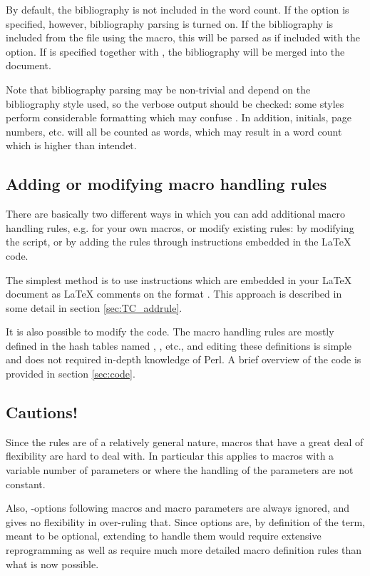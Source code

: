 \documentclass{article}
\begin{document}
By default, the bibliography is not included in the word count. If the  option is specified, however, bibliography parsing is turned on. If the bibliography is included from the  file using the  macro, this will be parsed as if included with the  option. If  is specified together with , the bibliography will be merged into the document.

Note that bibliography parsing may be non-trivial and depend on the bibliography style used, so the verbose output should be checked: some styles perform considerable formatting which may confuse \TeXcount{}. In addition, initials, page numbers, etc. will all be counted as words, which may result in a word count which is higher than intendet.

\subsection{Adding or modifying macro handling rules}

There are basically two different ways in which you can add additional macro handling rules, e.g. for your own macros, or modify existing rules: by modifying the \TeXcount{} script, or by adding the rules through \TeXcount{} instructions embedded in the \LaTeX{} code.

The simplest method is to use \TeXcount{} instructions which are embedded in your \LaTeX{} document as \LaTeX{} comments on the format . This approach is described in some detail in section \ref{sec:TC_addrule}.

It is also possible to modify the \TeXcount{} code. The macro handling rules are mostly defined in the hash tables named , , etc., and editing these definitions is simple and does not required in-depth knowledge of Perl. A brief overview of the \TeXcount{} code is provided in section \ref{sec:code}. 

\subsection{Cautions!}

Since the rules are of a relatively general nature, macros that have a great deal of flexibility are hard to deal with. In particular this applies to macros with a variable number of parameters or where the handling of the parameters are not constant.

Also, \code{[]}-options following macros and macro parameters are always ignored, and \TeXcount{} gives no flexibility in over-ruling that. Since options are, by definition of the term, meant to be optional, extending \TeXcount{} to handle them would require extensive reprogramming as well as require much more detailed macro definition rules than what is now possible.
\end{document}
